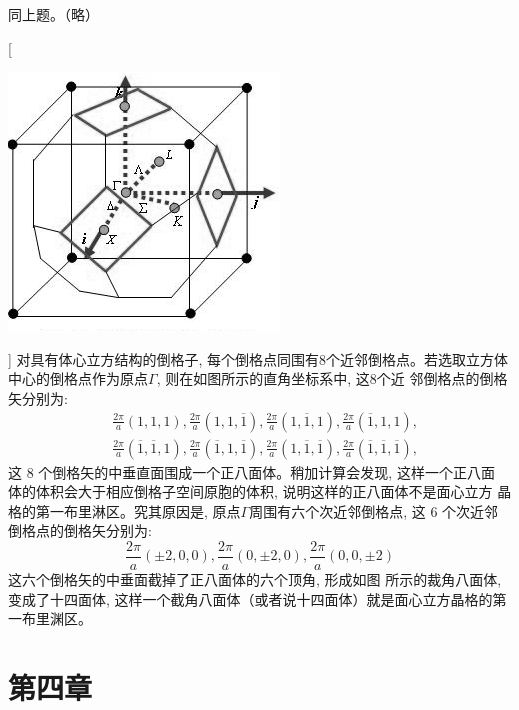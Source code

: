 \documentclass[UTF8,12pt, a4paper, oneside]{ctexart}
\begin{document}
    {同上题。（略）}

    [ \begin{center}
        \includegraphics{picture/3-12.png}
    \end{center}]
    {对具有体心立方结构的倒格子, 每个倒格点同围有8个近邻倒格点。若选取立方体中心的倒格点作为原点$\Gamma$, 则在如图所示的直角坐标系中, 这8个近 邻倒格点的倒格矢分别为:
        \[\begin{aligned}
            &\frac{2 \pi}{a}(1,1,1), \frac{2 \pi}{a}(1,1, \overline{1}), \frac{2 \pi}{a}(1, \overline{1}, 1), \frac{2 \pi}{a}(\overline{1}, 1,1), \\
            &\frac{2 \pi}{a}(\overline{1}, \overline{1}, 1), \frac{2 \pi}{a}(\overline{1}, 1, \overline{1}), \frac{2 \pi}{a}(1, \overline{1}, \overline{1}), \frac{2 \pi}{a}(\overline{1}, \overline{1}, \overline{1}),
            \end{aligned}\]这 8 个倒格矢的中垂直面围成一个正八面体。稍加计算会发现, 这样一个正八面 体的体积会大于相应倒格子空间原胞的体积, 说明这样的正八面体不是面心立方 晶格的第一布里淋区。究其原因是, 原点$\Gamma$周围有六个次近邻倒格点, 这 6 个次近邻倒格点的倒格矢分别为:
            \[\frac{2 \pi}{a}(\pm 2,0,0), \frac{2 \pi}{a}(0, \pm 2,0), \frac{2 \pi}{a}(0,0, \pm 2)\]这六个倒格矢的中垂面截掉了正八面体的六个顶角, 形成如图  所示的裁角八面体, 变成了十四面体, 这样一个截角八面体（或者说十四面体）就是面心立方晶格的第一布里渊区。}


\section{第四章}

\proi{}{}
\end{document}
